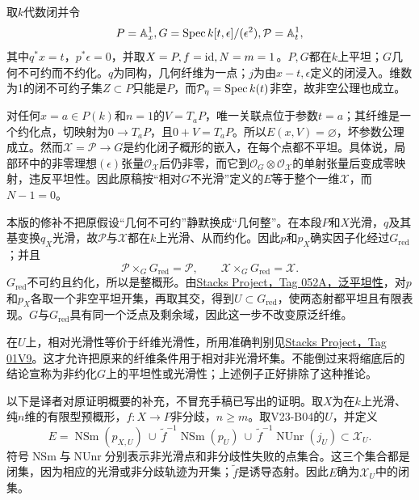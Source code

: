取$k$代数闭并令
\[
P=\mathbb A^1_x,
G=\operatorname{Spec} k[t,\epsilon]/(\epsilon^2),
\mathcal P=\mathbb A^1_t,
\]
其中$q^*x=t$，$p^*\epsilon=0$，并取$X=P,f=\mathrm{id},N=m=1$。$P,G$都在$k$上平坦；$G$几何不可约而不约化。$q$为同构，几何纤维为一点；$j$为由$x-t,\epsilon$定义的闭浸入。维数为1的闭不可约子集$Z\subset P$只能是$P$，而$\mathcal P_\eta=\operatorname{Spec} k(t)$非空，故非空公理也成立。

对任何$x=a\in P(k)$和$n=1$的$V=T_aP$，唯一关联点位于参数$t=a$；其纤维是一个约化点，切映射为$0\to T_aP$，且$0+V=T_aP$。所以$E(x,V)=\varnothing$，坏参数公理成立。然而$\mathcal X=\mathcal P\to G$是约化闭子概形的嵌入，在每个点都不平坦。具体说，局部环中的非零理想$(\epsilon)$张量$\mathcal O_{\mathcal X}$后仍非零，而它到$\mathcal O_G\otimes\mathcal O_{\mathcal X}$的单射张量后变成零映射，违反平坦性。因此原稿按“相对$G$不光滑”定义的$E$等于整个一维$\mathcal X$，而$N-1=0$。

本版的修补不把原假设“几何不可约”静默换成“几何整”。在本段$P$和$X$光滑，$q$及其基变换$q_X$光滑，故$\mathcal P$与$\mathcal X$都在$k$上光滑、从而约化。因此$p$和$p_X$确实因子化经过$G_{\mathrm{red}}$；并且
\[
\mathcal P\times_GG_{\mathrm{red}}=\mathcal P,
\qquad
\mathcal X\times_GG_{\mathrm{red}}=\mathcal X.
\]
$G_{\mathrm{red}}$不可约且约化，所以是整概形。由\href{https://stacks.math.columbia.edu/tag/052A}{Stacks Project，Tag 052A，泛平坦性}，对$p$和$p_X$各取一个非空平坦开集，再取其交，得到$U\subset G_{\mathrm{red}}$，使两态射都平坦且有限表现。$G$与$G_{\mathrm{red}}$具有同一个泛点及剩余域，因此这一步不改变原泛纤维。

在$U$上，相对光滑性等价于纤维光滑性，所用准确判别见\href{https://stacks.math.columbia.edu/tag/01V9}{Stacks Project，Tag 01V9}。这才允许把原来的纤维条件用于相对非光滑坏集。不能倒过来将缩底后的结论宣称为非约化$G$上的平坦性或光滑性；上述例子正好排除了这种推论。

以下是译者对原证明概要的补充，不冒充手稿已写出的证明。取$X$为在$k$上光滑、纯$n$维的有限型预概形，$f:X\to P$非分歧，$n\geq m$。取V23-B04的$U$，并定义
\[
E=\operatorname{NSm}(p_{X,U})\ \cup\
\widetilde f^{-1}\operatorname{NSm}(p_U)\ \cup\
\widetilde f^{-1}\operatorname{NUnr}(j_U)
\subset\mathcal X_U.
\]
符号$\operatorname{NSm}$与$\operatorname{NUnr}$分别表示非光滑点和非分歧性失败的点集合。这三个集合都是闭集，因为相应的光滑或非分歧轨迹为开集；$\widetilde f$是诱导态射。因此$E$确为$\mathcal X_U$中的闭集。


